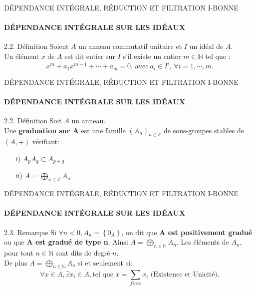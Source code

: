 \documentclass[11pt,a4paper]{beamer}
\begin{document}
\begin{frame}{DÉPENDANCE INTÉGRALE, RÉDUCTION ET FILTRATION I-BONNE}
	\framesubtitle{DÉPENDANCE INTÉGRALE SUR LES IDÉAUX}
	\begin{block}{2.2. Définition}
		Soient $A$ un anneau commutatif unitaire et $I$ un idéal de $A$.\\ Un élément $x$ de $A$ est dit entier sur $I$ s'il existe un entier $m \in \mathbb{N}$ tel que : 
		\[ 	x^m + a_1 x^{m-1} + \cdots + a_m = 0\text{, avec} \ a_i \in I^i,\, \forall i=1, \cdots ,m. \]	\pause
	\end{block}
\end{frame}

\begin{frame}{DÉPENDANCE INTÉGRALE, RÉDUCTION ET FILTRATION I-BONNE}
	\framesubtitle{DÉPENDANCE INTÉGRALE SUR LES IDÉAUX}
	\begin{block}{2.2. Définition}
		Soit $A$ un anneau.\\
		Une \textbf{graduation sur A} est une famille $(A_n)_{n \in \mathbb{Z}}$ de  sous-groupes stables de $(A,+)$ vérifiant:
		\begin{enumerate}
			\item[i)] $ A_p A_q \subset A_{p+q} $ \pause
			\item[ii)] $ A =\displaystyle \bigoplus_{n \in \mathbb{Z}}{A_n} $
		\end{enumerate}
	\end{block}
\end{frame}


\begin{frame}{DÉPENDANCE INTÉGRALE, RÉDUCTION ET FILTRATION I-BONNE}
	\framesubtitle{DÉPENDANCE INTÉGRALE SUR LES IDÉAUX}
	\begin{alertblock}{2.3. Remarque}
	Si $\forall n < 0, A_n = \left\{0_A\right\}$, on dit que \textbf{A est positivement gradué} ou que \textbf{A est gradué de type n}. Ainsi $ A =\displaystyle \bigoplus_{n \in \mathbb{N}}{A_n} $. Les éléments de $A_n$, pour tout $n \in \mathbb{N} $ sont dits de degré $n$.\\
	De plus $ A =\displaystyle \bigoplus_{n \in \mathbb{N}}{A_n} $ si et seulement si:
	\[ \forall x \in A, \exists x_i \in A, \text{tel que } x = \sum_{finie}^{} x_i \text{ (Existence et Unicité)}. \]
	\end{alertblock}
\end{frame}
\end{document}
